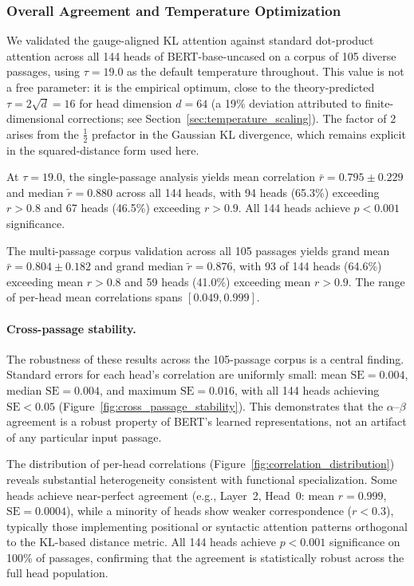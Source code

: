 \documentclass[twoside,11pt]{article}
\begin{document}
\subsubsection{Overall Agreement and Temperature Optimization}

We validated the gauge-aligned KL attention against standard dot-product attention across all 144 heads of BERT-base-uncased on a corpus of 105 diverse passages, using $\tau = 19.0$ as the default temperature throughout. This value is not a free parameter: it is the empirical optimum, close to the theory-predicted $\tau = 2\sqrt{d} = 16$ for head dimension $d = 64$ (a 19\% deviation attributed to finite-dimensional corrections; see Section~\ref{sec:temperature_scaling}). The factor of $2$ arises from the $\frac{1}{2}$ prefactor in the Gaussian KL divergence, which remains explicit in the squared-distance form used here.

At $\tau = 19.0$, the single-passage analysis yields mean correlation $\bar{r} = 0.795 \pm 0.229$ and median $\tilde{r} = 0.880$ across all 144 heads, with 94 heads (65.3\%) exceeding $r > 0.8$ and 67 heads (46.5\%) exceeding $r > 0.9$. All 144 heads achieve $p < 0.001$ significance.

The multi-passage corpus validation across all 105 passages yields grand mean $\bar{r} = 0.804 \pm 0.182$ and grand median $\tilde{r} = 0.876$, with 93 of 144 heads (64.6\%) exceeding mean $r > 0.8$ and 59 heads (41.0\%) exceeding mean $r > 0.9$. The range of per-head mean correlations spans $[0.049, 0.999]$.

\paragraph{Cross-passage stability.} The robustness of these results across the 105-passage corpus is a central finding. Standard errors for each head's correlation are uniformly small: mean $\mathrm{SE} = 0.004$, median $\mathrm{SE} = 0.004$, and maximum $\mathrm{SE} = 0.016$, with all 144 heads achieving $\mathrm{SE} < 0.05$ (Figure~\ref{fig:cross_passage_stability}). This demonstrates that the $\alpha$--$\beta$ agreement is a robust property of BERT's learned representations, not an artifact of any particular input passage.

The distribution of per-head correlations (Figure~\ref{fig:correlation_distribution}) reveals substantial heterogeneity consistent with functional specialization. Some heads achieve near-perfect agreement (e.g., Layer~2, Head~0: mean $r = 0.999$, $\mathrm{SE} = 0.0004$), while a minority of heads show weaker correspondence ($r < 0.3$), typically those implementing positional or syntactic attention patterns orthogonal to the KL-based distance metric. All 144 heads achieve $p < 0.001$ significance on 100\% of passages, confirming that the agreement is statistically robust across the full head population.
\end{document}

